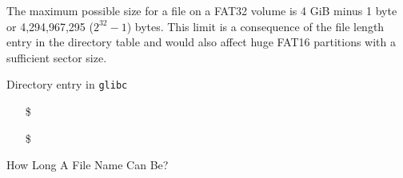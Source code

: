 The maximum possible size for a file on a FAT32 volume is 4 GiB minus 1 byte or
4,294,967,295 ($2^{32} − 1$) bytes. This limit is a consequence of the file length entry
in the directory table and would also affect huge FAT16 partitions with a sufficient
sector size.

\begin{frame}%
  \begin{block}{Directory entry in \texttt{glibc}}
  \end{block}
  \begin{itemize}
  \item[\$] 
  \item[\$] 
  \end{itemize}
\end{frame}

\begin{frame}{How Long A File Name Can Be?}
  \label{fig:filename}
  \centering
  \mode<beamer>{ \texttt{[image: dir1]} }%
\end{frame}

